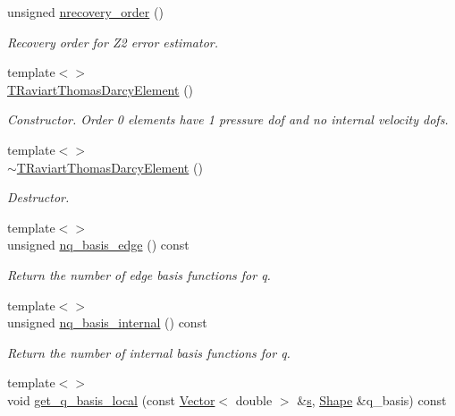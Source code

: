\begin{DoxyCompactItemize}
unsigned \hyperlink{classoomph_1_1TRaviartThomasDarcyElement_adb1607a15629d5b7314ddd29bd61fc15}{nrecovery\+\_\+order} ()
\begin{DoxyCompactList}\small\item\em Recovery order for Z2 error estimator. \end{DoxyCompactList}\item 
{\footnotesize template$<$$>$ }\\\hyperlink{classoomph_1_1TRaviartThomasDarcyElement_a7b5e3257572e6f3cd0a9e6d927f3eaf4}{T\+Raviart\+Thomas\+Darcy\+Element} ()
\begin{DoxyCompactList}\small\item\em Constructor. Order 0 elements have 1 pressure dof and no internal velocity dofs. \end{DoxyCompactList}\item 
{\footnotesize template$<$$>$ }\\\hyperlink{classoomph_1_1TRaviartThomasDarcyElement_a7bf88a921b9d6fc7a9b15d4f8941d274}{$\sim$\+T\+Raviart\+Thomas\+Darcy\+Element} ()
\begin{DoxyCompactList}\small\item\em Destructor. \end{DoxyCompactList}\item 
{\footnotesize template$<$$>$ }\\unsigned \hyperlink{classoomph_1_1TRaviartThomasDarcyElement_a9b4ab72d9ab1142f3f68737935bc0075}{nq\+\_\+basis\+\_\+edge} () const
\begin{DoxyCompactList}\small\item\em Return the number of edge basis functions for q. \end{DoxyCompactList}\item 
{\footnotesize template$<$$>$ }\\unsigned \hyperlink{classoomph_1_1TRaviartThomasDarcyElement_a27b5298596626c740e198efbd90ad8f0}{nq\+\_\+basis\+\_\+internal} () const
\begin{DoxyCompactList}\small\item\em Return the number of internal basis functions for q. \end{DoxyCompactList}\item 
{\footnotesize template$<$$>$ }\\void \hyperlink{classoomph_1_1TRaviartThomasDarcyElement_a4d60f4e499f6fc7a1ec123b019231a14}{get\+\_\+q\+\_\+basis\+\_\+local} (const \hyperlink{classoomph_1_1Vector}{Vector}$<$ double $>$ \&\hyperlink{cfortran_8h_ab7123126e4885ef647dd9c6e3807a21c}{s}, \hyperlink{classoomph_1_1Shape}{Shape} \&q\+\_\+basis) const

\end{DoxyCompactItemize}
